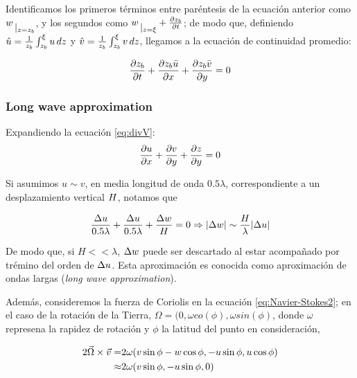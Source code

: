 Identificamos los primeros términos entre paréntesis de la ecuaci\'on anterior como $w \rvert{z=\zbot}$, y los segundos como $w\rvert{z=\sup} + \pddt{\zbot}$; de modo que, definiendo $\hat{u} = \frac{1}{z_b} \int_{z_b}^{\xi} u \, dz$ y $\hat{v} = \frac{1}{z_b} \int_{z_b}^{\xi} v \, dz$, llegamos a la ecuación de continuidad promedio:

\begin{equation}
  \label{eq:depth-average}
  \frac{\partial z_b}{\partial t} + \frac{\partial z_b \bar{u}}{\partial x} + \frac{\partial z_b \bar{v}}{\partial y} = 0
\end{equation}

\subsubsection{Long wave approximation}
\label{sec:longwaveapprox}

Expandiendo la ecuación \eqref{eq:divV}:
\begin{equation}
  \label{eq:divergence}
  \frac{\partial u}{\partial x} + \frac{\partial v}{\partial y} + \frac{\partial z}{\partial y} = 0  
\end{equation}

Si asumimos $u \sim v$, en media longitud de onda $0.5 \lambda $, correspondiente a un desplazamiento vertical $H$, notamos que

\begin{equation}
\label{eq:1}
  \frac{\Delta u}{0.5 \lambda} + \frac{\Delta u}{0.5 \lambda} + \frac{\Delta w}{H} = 0 \Rightarrow |\Delta w| \sim \frac{H}{\lambda} | \Delta u |
\end{equation}

De modo que, si $H << \lambda$, $\Delta w$ puede ser descartado al estar acompañado por trémino del orden de $\Delta u$.
Esta aproximaci\'on es conocida como aproximación de ondas largas (\textit{long wave approximation}).

Además, consideremos la fuerza de Coriolis en la ecuación \eqref{eq:Navier-Stokes2};
en el caso de la rotación de la Tierra, $\Omega = (0, \omega co(\phi), \omega sin(\phi)$, donde $\omega$ represena la rapidez de rotación y $\phi$ la latitud del punto en consideraci\'on,

\begin{eqnarray}
  \label{eq:coriolis-approx-0}
  2 \v{\Omega} \times \v{v} = & 2 \omega (v \sin \phi - w \cos \phi, -u \sin \phi, u \cos \phi) \\
  \approx & 2 \omega ( v \sin \phi, -u \sin \phi, 0 ) %
\end{eqnarray}

